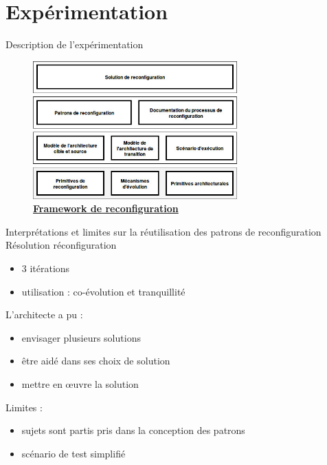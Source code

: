 \section{Expérimentation}
\begin{frame}{Description de l'expérimentation}
\begin{figure}
\includegraphics[width=0.7\textwidth]{imgs/framework}
\caption{\underline{\textbf{Framework de reconfiguration}}}
\end{figure}    
\end{frame}


\begin{frame}{Interprétations et limites sur la réutilisation des
patrons de reconfiguration}
Résolution réconfiguration 
\begin{itemize}
\item 3 itérations
\item utilisation : co-évolution et tranquillité
\end{itemize}

L'architecte a pu :
\begin{itemize}
\item envisager plusieurs solutions
\item être aidé dans ses choix de solution
\item mettre en \oe{}uvre la solution
\end{itemize}

Limites : 
\begin{itemize}
\item sujets sont partis pris dans la conception des patrons
\item scénario de test simplifié
\end{itemize}

\end{frame}
